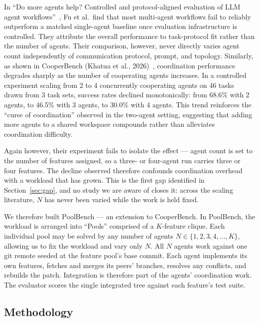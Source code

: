\documentclass[11pt,a4paper]{article}
\begin{document}
In ``Do more agents help? Controlled and protocol-aligned evaluation of LLM agent workflows''~\cite{fu2026agents}, Fu et al.\ find that most multi-agent workflows fail to reliably outperform a matched single-agent baseline once evaluation infrastructure is controlled. They attribute the overall performance to task-protocol fit rather than the number of agents. Their comparison, however, never directly varies agent count independently of communication protocol, prompt, and topology. Similarly, as shown in CooperBench (Khatua et al., 2026)~\cite{khatua2026cooperbench}, coordination performance degrades sharply as the number of cooperating agents increases. In a controlled experiment scaling from 2 to 4 concurrently cooperating agents on 46 tasks drawn from 3 task sets, success rates declined monotonically: from 68.6\% with 2 agents, to 46.5\% with 3 agents, to 30.0\% with 4 agents. This trend reinforces the ``curse of coordination'' observed in the two-agent setting, suggesting that adding more agents to a shared workspace compounds rather than alleviates coordination difficulty.

Again however, their experiment fails to isolate the effect --- agent count is set to the number of features assigned, so a three- or four-agent run carries three or four features. The decline observed therefore confounds coordination overhead with a workload that has grown. This is the first gap identified in Section~\ref{sec:gap}, and no study we are aware of closes it: across the scaling literature, $N$ has never been varied while the work is held fixed.

We therefore built PoolBench --- an extension to CooperBench. In PoolBench, the workload is arranged into ``Pools'' comprised of a $K$-feature clique. Each individual pool may be solved by any number of agents $N \in \{1, 2, 3, 4, \ldots, K\}$, allowing us to fix the workload and vary only $N$. All $N$ agents work against one git remote seeded at the feature pool's base commit. Each agent implements its own features, fetches and merges its peers' branches, resolves any conflicts, and rebuilds the patch. Integration is therefore part of the agents' coordination work. The evaluator scores the single integrated tree against each feature's test suite.

\subsection{Methodology}\label{sec:scalingdesign}
\end{document}
